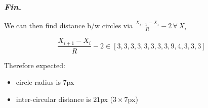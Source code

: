 \documentclass{beamer}
\begin{document}
\begin{frame}\frametitle{\textit{Fin.}}
We can then find distance b/w circles via
$\frac{X_{i+1} - X_i}R - 2\, \forall\, X_i$

$$
\frac{X_{i+1} - X_i}R - 2 \in
[3, 3, 3, 3, 3, 3, 3, 3, 9, 4, 3, 3, 3]
$$

Therefore expected:
\begin{itemize}
    \item circle radius is $7$px
    \item inter-circular distance is $21$px ($3\times 7$px)
\end{itemize}
\end{frame}
\end{document}
